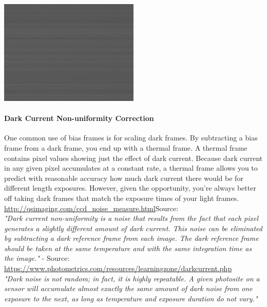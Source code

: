 \begin{center}
\includegraphics[height=5cm]{images/blackframes-gainx1-offset2047-64ms-01-simple-darkframe-no-blackcol}
\end{center}





\paragraph{Dark Current Non-uniformity Correction}

One common use of bias frames is for scaling dark frames. By subtracting a bias frame from a dark frame, you end up with a thermal frame. A thermal frame contains pixel values showing just the effect of dark current. Because dark current in any given pixel accumulates at a constant rate, a thermal frame allows you to predict with reasonable accuracy how much dark current there would be for different length exposures. However, given the opportunity, you’re always better off taking dark frames that match the exposure times of your light frames.\\

\href{http://qsimaging.com/ccd_noise_measure.html}{http://qsimaging.com/ccd\_noise\_measure.html}{Source}: \\

\textit{"Dark current non-uniformity is a noise that results from the fact that each pixel generates a slightly different amount of dark current. This noise can be eliminated by subtracting a dark reference frame from each image. The dark reference frame should be taken at the same temperature and with the same integration time as the image."} - Source: \href{https://www.photometrics.com/resources/learningzone/darkcurrent.php}{https://www.photometrics.com/resources/learningzone/darkcurrent.php}\\

\textit{"Dark noise is not random; in fact, it is highly repeatable. A given photosite on a sensor will accumulate almost exactly the same amount of dark noise from one exposure to the next, as long as temperature and exposure duration do not vary."}\\

